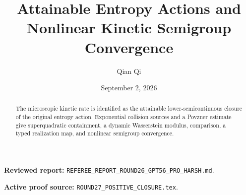 \documentclass[11pt,reqno]{amsart}
\title[B4 Round 27 revision]{Attainable Entropy Actions and Nonlinear Kinetic Semigroup Convergence}
\author{Qian Qi}
\date{September 2, 2026}
\begin{document}
\begin{abstract}The microscopic kinetic rate is identified as the attainable lower-semicontinuous closure of the original entropy action. Exponential collision sources and a Povzner estimate give superquadratic containment, a dynamic Wasserstein modulus, comparison, a typed realization map, and nonlinear semigroup convergence.\end{abstract}
\maketitle
\noindent\textbf{Reviewed report:} \texttt{REFEREE\_REPORT\_ROUND26\_GPT56\_PRO\_HARSH.md}.\par
\noindent\textbf{Active proof source:} \texttt{ROUND27\_POSITIVE\_CLOSURE.tex}.\par

\end{document}
